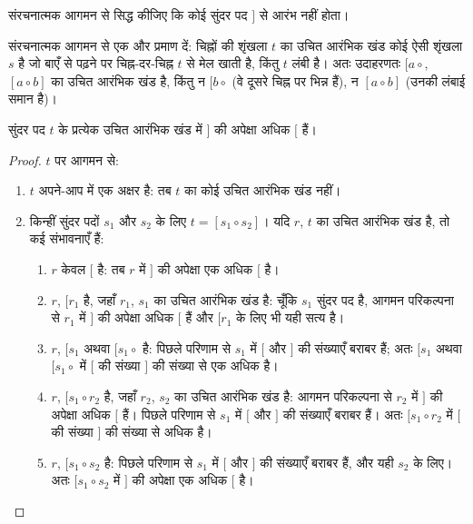 \documentclass[../../../include/open-logic-section]{subfiles}
\begin{document}
\begin{prob}
  संरचनात्मक आगमन से सिद्ध कीजिए कि कोई सुंदर पद $]$ से आरंभ नहीं होता।
\end{prob}

संरचनात्मक आगमन से एक और प्रमाण दें: चिह्नों की शृंखला $t$ का उचित आरंभिक
खंड कोई ऐसी शृंखला $s$ है जो बाएँ से पढ़ने पर चिह्न-दर-चिह्न $t$ से मेल
खाती है, किंतु $t$ लंबी है। अतः उदाहरणतः $[a\circ{}$, $[a\circ b]$ का उचित
आरंभिक खंड है, किंतु न $[b\circ{}$ (वे दूसरे चिह्न पर भिन्न हैं), न
$[a\circ b]$ (उनकी लंबाई समान है)।

\begin{prop}
  सुंदर पद $t$ के प्रत्येक उचित आरंभिक खंड में $]$ की अपेक्षा अधिक $[$ हैं।
\end{prop}

\begin{proof}
  $t$ पर आगमन से:
  \begin{enumerate}
  \item $t$ अपने-आप में एक अक्षर है: तब $t$ का कोई उचित आरंभिक खंड नहीं।
  \item किन्हीं सुंदर पदों $s_1$ और $s_2$ के लिए $t=[s_1\circ s_2]$। यदि
    $r$, $t$ का उचित आरंभिक खंड है, तो कई संभावनाएँ हैं:
    \begin{enumerate}
    \item $r$ केवल $[$ है: तब $r$ में $]$ की अपेक्षा एक अधिक $[$ है।
    \item $r$, $[r_1$ है, जहाँ $r_1$, $s_1$ का उचित आरंभिक खंड है: चूँकि
      $s_1$ सुंदर पद है, आगमन परिकल्पना से $r_1$ में $]$ की अपेक्षा अधिक
      $[$ हैं और $[r_1$ के लिए भी यही सत्य है।
    \item $r$, $[s_1$ अथवा $[s_1\circ{}$ है: पिछले परिणाम से $s_1$ में
      $[$ और $]$ की संख्याएँ बराबर हैं; अतः $[s_1$ अथवा $[s_1\circ{}$ में
      $[$ की संख्या $]$ की संख्या से एक अधिक है।
    \item $r$, $[s_1\circ r_2$ है, जहाँ $r_2$, $s_2$ का उचित आरंभिक खंड
      है: आगमन परिकल्पना से $r_2$ में $]$ की अपेक्षा अधिक $[$ हैं। पिछले
      परिणाम से $s_1$ में $[$ और $]$ की संख्याएँ बराबर हैं। अतः
      $[s_1\circ r_2$ में $[$ की संख्या $]$ की संख्या से अधिक है।
    \item $r$, $[s_1\circ s_2$ है: पिछले परिणाम से $s_1$ में $[$ और $]$
      की संख्याएँ बराबर हैं, और यही $s_2$ के लिए। अतः $[s_1\circ s_2$ में
      $]$ की अपेक्षा एक अधिक $[$ है।
    \end{enumerate}
  \end{enumerate}
\end{proof}
\end{document}
